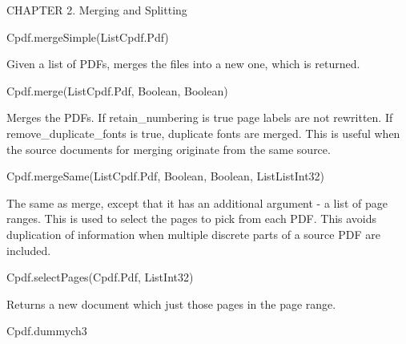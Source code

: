 CHAPTER 2. Merging and Splitting

Cpdf.mergeSimple(List{Cpdf.Pdf})

Given a list of PDFs, 
merges the files into a new one, which is returned.

Cpdf.merge(List{Cpdf.Pdf}, Boolean, Boolean)

Merges the
PDFs. If retain_numbering is true page labels are not rewritten. If
remove_duplicate_fonts is true, duplicate fonts are merged. This is useful
when the source documents for merging originate from the same source.

Cpdf.mergeSame(List{Cpdf.Pdf}, Boolean, Boolean, List{List{Int32}})

The same as merge, except that it has an additional
argument - a list of page ranges. This is used to select the pages to
pick from each PDF. This avoids duplication of information when multiple
discrete parts of a source PDF are included.

Cpdf.selectPages(Cpdf.Pdf, List{Int32})

Returns a new document which just those pages
in the page range.

Cpdf.dummych3

